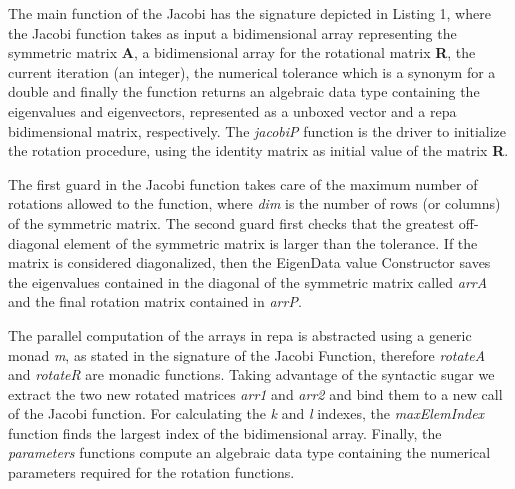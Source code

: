 \documentclass{tmr}
\begin{document}
The main function of the Jacobi has the signature depicted in Listing 1, where the Jacobi function takes as
input a bidimensional array representing the symmetric matrix {\textbf A}, a bidimensional
array for the rotational matrix {\textbf R}, the current iteration (an integer),
the numerical tolerance which is a synonym for a double and
finally the function returns an algebraic data type containing the eigenvalues
and eigenvectors, represented as a unboxed vector and a repa bidimensional matrix, respectively.
The \textit{jacobiP} function is the driver to initialize the rotation procedure, using
the identity matrix as initial value of the matrix \textbf{R}. 

The first guard in the Jacobi function takes care of the maximum number of rotations allowed
to the function, where \textit{dim} is the number of rows (or columns) of the symmetric matrix.
The second guard first checks that the greatest off-diagonal element of the symmetric
matrix is larger than the tolerance. If the matrix is considered diagonalized, then the 
EigenData value Constructor saves the eigenvalues contained in the diagonal of the symmetric
matrix called \textit{arrA} and the final rotation matrix contained in \textit{arrP}.

The parallel computation of the arrays in repa is abstracted using a generic 
monad \textit{m}, as stated in the signature of the Jacobi Function,
therefore \textit{rotateA} and \textit{rotateR} are monadic functions. Taking
advantage of the syntactic sugar we extract the two new rotated matrices \textit{arr1} and
\textit{arr2} and bind them to a new call of the Jacobi function.
For calculating the \textit{k} and \textit{l} indexes, the \textit{maxElemIndex} function
finds the largest index of the bidimensional array. Finally, the \textit{parameters} functions
compute an algebraic data type containing the numerical parameters required for the rotation functions. 
\end{document}

